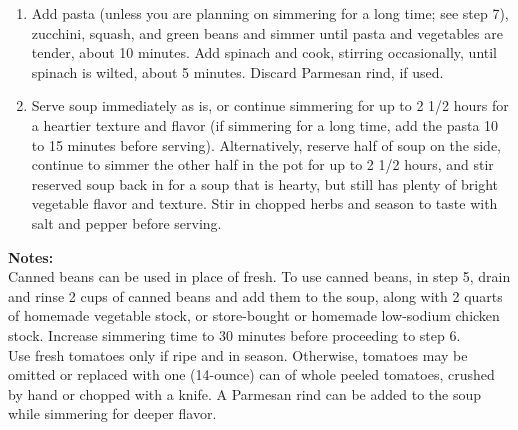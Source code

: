 \documentclass{article}
\numberwithin{figure}{section}
\numberwithin{equation}{section}
\begin{document}
\begin{enumerate}
\item Add pasta (unless you are planning on simmering for a long time; see step 7), zucchini, squash, and green beans and simmer until pasta and vegetables are tender, about 10 minutes. Add spinach and cook, stirring occasionally, until spinach is wilted, about 5 minutes. Discard Parmesan rind, if used.
\item Serve soup immediately as is, or continue simmering for up to 2 1/2 hours for a heartier texture and flavor (if simmering for a long time, add the pasta 10 to 15 minutes before serving). Alternatively, reserve half of soup on the side, continue to simmer the other half in the pot for up to 2 1/2 hours, and stir reserved soup back in for a soup that is hearty, but still has plenty of bright vegetable flavor and texture. Stir in chopped herbs and season to taste with salt and pepper before serving.
\end{enumerate}

{\bf Notes:}\\
Canned beans can be used in place of fresh. To use canned beans, in step 5, drain and rinse 2 cups of canned beans and add them to the soup, along with 2 quarts of homemade vegetable stock, or store-bought or homemade low-sodium chicken stock. Increase simmering time to 30 minutes before proceeding to step 6.\\

Use fresh tomatoes only if ripe and in season. Otherwise, tomatoes may be omitted or replaced with one (14-ounce) can of whole peeled tomatoes, crushed by hand or chopped with a knife. A Parmesan rind can be added to the soup while simmering for deeper flavor.\\
\end{document}
